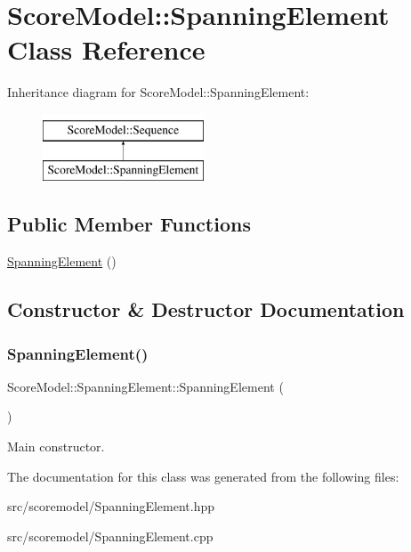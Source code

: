 \hypertarget{classScoreModel_1_1SpanningElement}{}\section{Score\+Model\+::Spanning\+Element Class Reference}
\label{classScoreModel_1_1SpanningElement}
Inheritance diagram for Score\+Model\+::Spanning\+Element\+:\begin{figure}[H]
\begin{center}
\leavevmode
\includegraphics[height=2.000000cm]{classScoreModel_1_1SpanningElement}
\end{center}
\end{figure}
\subsection*{Public Member Functions}
\begin{DoxyCompactItemize}
\item 
\mbox{\hyperlink{classScoreModel_1_1SpanningElement_a4c93d060171f79969089c512e11b2bad}{Spanning\+Element}} ()
\end{DoxyCompactItemize}


\subsection{Constructor \& Destructor Documentation}
\mbox{\label{classScoreModel_1_1SpanningElement_a4c93d060171f79969089c512e11b2bad}} 
\subsubsection{\texorpdfstring{SpanningElement()}{SpanningElement()}}
{\footnotesize\ttfamily Score\+Model\+::\+Spanning\+Element\+::\+Spanning\+Element (\begin{DoxyParamCaption}{ }\end{DoxyParamCaption})}

Main constructor. 

The documentation for this class was generated from the following files\+:\begin{DoxyCompactItemize}
\item 
src/scoremodel/Spanning\+Element.\+hpp\item 
src/scoremodel/Spanning\+Element.\+cpp\end{DoxyCompactItemize}
